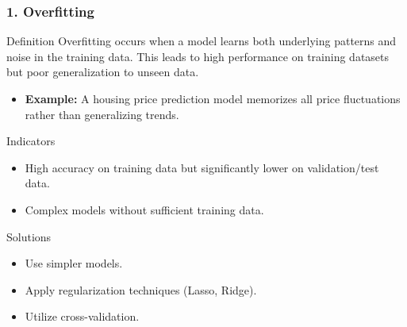 \documentclass[aspectratio=169]{beamer}
\begin{document}
\begin{frame}
    \frametitle{1. Overfitting}
    \begin{block}{Definition}
        Overfitting occurs when a model learns both underlying patterns and noise in the training data. This leads to high performance on training datasets but poor generalization to unseen data.
    \end{block}
    \begin{itemize}
        \item \textbf{Example:} A housing price prediction model memorizes all price fluctuations rather than generalizing trends.
    \end{itemize}
    
    \begin{block}{Indicators}
        \begin{itemize}
            \item High accuracy on training data but significantly lower on validation/test data.
            \item Complex models without sufficient training data.
        \end{itemize}
    \end{block}
    
    \begin{block}{Solutions}
        \begin{itemize}
            \item Use simpler models.
            \item Apply regularization techniques (Lasso, Ridge).
            \item Utilize cross-validation.
        \end{itemize}
    \end{block}
\end{frame}
\end{document}
